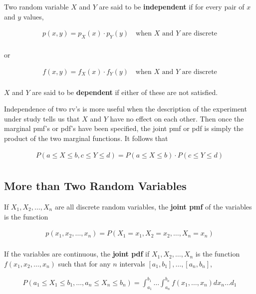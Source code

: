 \begin{definition}
    Two random variable $X$ and $Y$ are said to be \textbf{independent} if for every pair of $x$ and $y$ values, 
    
    \begin{align*}
        p(x,y) = p_X(x)\cdot p_Y(y) \quad \text{when }X\text{ and }Y\text{ are discrete} \\
    \end{align*}
    
    or

    \begin{align*}
        f(x,y) = f_X(x)\cdot f_Y(y)\quad \text{when }X\text{ and }Y\text{ are discrete} \\
    \end{align*}

    $X$ and $Y$ are said to be \textbf{dependent} if either of these are not satisfied.

    Independence of two rv's is more useful when the description of the experiment under study tells us that $X$ and $Y$ have no effect on each other. Then once the marginal pmf's or pdf's have been specified, the joint pmf or pdf is simply the product of the two marginal functions. It follows that 

    \begin{align*}
        P(a\leq X\leq b, c\leq Y\leq d) = P(a\leq X\leq b)\cdot P(c\leq Y\leq d) \\
    \end{align*}
\end{definition}

\subsection{More than Two Random Variables}

\begin{definition}
    If $X_1, X_2,\dots,X_n$ are all discrete random variables, the \textbf{joint pmf} of the variables is the function 

    \begin{align*}
        p(x_1,x_2,\dots,x_n) = P(X_1=x_1, X_2=x_2,\dots,X_n=x_n) \\
    \end{align*}

    If the variables are continuous, the \textbf{joint pdf} if $X_1,X_2,\dots,X_n$ is the function $f(x_1,x_2,\dots,x_n)$ such that for any $n$ intervals $[a_1,b_1],\dots,[a_n,b_n]$, 

    \begin{align*}
        P(a_1\leq X_1\leq b_1,\dots,a_n\leq X_n\leq b_n) = \int_{a_1}^{b_1}\dots\int_{a_n}^{b_n} f(x_1,\dots,x_n) dx_n\dots d_1 \\
    \end{align*}
\end{definition}

